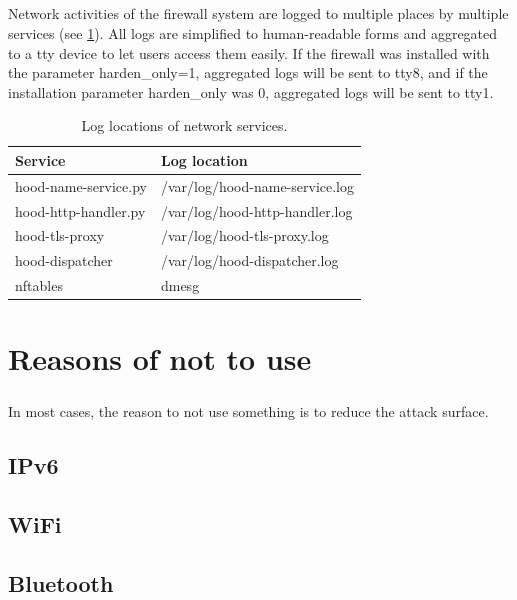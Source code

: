 \documentclass[mscthesis]{usiinfthesis}
\begin{document}
\paragraph{}
Network activities of the firewall system are logged to multiple places by multiple services (see \cref{tab:network_log}). All logs are simplified to human-readable forms and aggregated to a tty device to let users access them easily. If the firewall was installed with the parameter harden\_only=1, aggregated logs will be sent to tty8, and if the installation parameter harden\_only was 0, aggregated logs will be sent to tty1.
\begin{table}[H]
  \begin{tabular}{|p{95mm}|p{95mm}|}
    \hline
    Service              & Log location                   \\
    \hline
    hood-name-service.py & /var/log/hood-name-service.log \\
    hood-http-handler.py & /var/log/hood-http-handler.log \\
    hood-tls-proxy       & /var/log/hood-tls-proxy.log    \\
    hood-dispatcher      & /var/log/hood-dispatcher.log   \\
    nftables             & dmesg                          \\
    \hline
  \end{tabular}
  \caption{Log locations of network services.}
  \label{tab:network_log}
\end{table}

\chapter{Reasons of not to use}
\paragraph{}
In most cases, the reason to not use something is to reduce the attack surface.

\section{IPv6}
\section{WiFi}
\section{Bluetooth}
\end{document}
